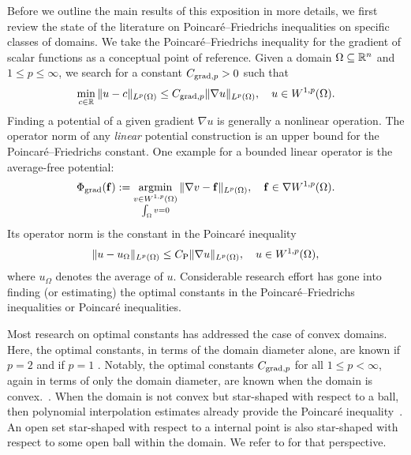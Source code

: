 \documentclass[a4paper]{article}
\begin{document}
Before we outline the main results of this exposition in more details, 
we first review the state of the literature on Poincar\'e--Friedrichs inequalities on specific classes of domains. 
We take the Poincar\'e--Friedrichs inequality for the gradient of scalar functions as a conceptual point of reference.
Given a domain $\Omega \subseteq {\mathbb R}^{n}$ and $1 \leq p \leq \infty$,
we search for a constant $C_{\operatorname{grad},p} > 0$ such that 
\begin{align*}
    \min\limits_{c\in{\mathbb R}}
    \| u - c \|_{L^{p}(\Omega)}
    \leq 
    C_{\operatorname{grad},p} \| \nabla u \|_{L^p(\Omega)},
    \quad 
    u \in W^{1,p}(\Omega)
    .
\end{align*}
Finding a potential of a given gradient $\nabla u$ is generally a nonlinear operation. 
The operator norm of any \emph{linear} potential construction is an upper bound for the Poincar\'e--Friedrichs constant. 
One example for a bounded linear operator is the average-free potential:
\begin{align*}
    \Phi_{\operatorname{grad}}( {\mathbf f} ) 
    := 
    \operatorname*{{\rm argmin}}\limits_{ \substack{ v \in W^{1,p}(\Omega) \\ \int_\Omega v = 0 } } \| \nabla v - {\mathbf f} \|_{L^{p}(\Omega)},
    \quad 
    {\mathbf f} \in \nabla W^{1,p}(\Omega)
    .
\end{align*}
Its operator norm is the constant in the Poincar\'e inequality 
\begin{align*}
    \| u - u_{\Omega} \|_{L^{p}(\Omega)}
    \leq 
    C_{\rm P} \| \nabla u \|_{L^p(\Omega)},
    \quad 
    u \in W^{1,p}(\Omega)
    ,
\end{align*}
where $u_\Omega$ denotes the average of $u$.
Considerable research effort has gone into finding (or estimating) the optimal constants in the Poincar\'e--Friedrichs inequalities or Poincar\'e inequalities. 

Most research on optimal constants has addressed the case of convex domains. 
Here, the optimal constants, in terms of the domain diameter alone, are known if $p=2$ \cite{bebendorf2003note} and if $p=1$ \cite{acosta2004optimal}. 
Notably, the optimal constants $C_{\operatorname{grad},p}$ for all $1 \leq p < \infty$, again in terms of only the domain diameter, are known when the domain is convex.~\cite{esposito2013poincare,ferone2012remark}.
When the domain is not convex but star-shaped with respect to a ball,
then polynomial interpolation estimates already provide the Poincar\'e inequality~\cite{ern2021finite}. 
An open set star-shaped with respect to a internal point is also star-shaped with respect to some open ball within the domain.
We refer to \cite{hurri1988poincare} for that perspective.
\end{document}
